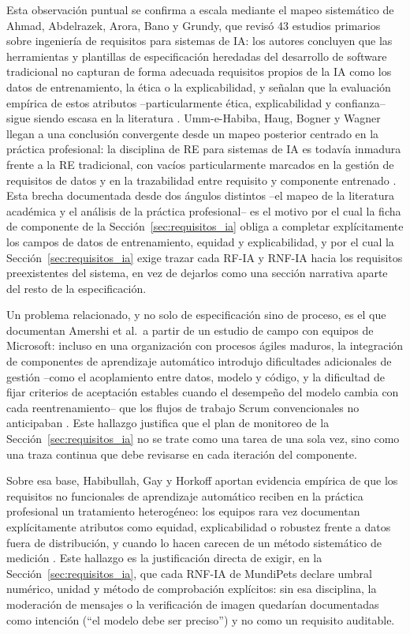 \documentclass[journal,onecolumn]{IEEEtran}
\begin{document}
	Esta observación puntual se confirma a escala mediante el mapeo sistemático de Ahmad, Abdelrazek,
	Arora, Bano y Grundy, que revisó 43 estudios primarios sobre ingeniería de requisitos para
	sistemas de IA: los autores concluyen que las herramientas y plantillas de especificación
	heredadas del desarrollo de software tradicional no capturan de forma adecuada requisitos
	propios de la IA como los datos de entrenamiento, la ética o la explicabilidad, y señalan que
	la evaluación empírica de estos atributos --particularmente ética, explicabilidad y
	confianza-- sigue siendo escasa en la literatura \cite{ahmad2023}. Umm-e-Habiba, Haug, Bogner
	y Wagner llegan a una conclusión convergente desde un mapeo posterior centrado en la práctica
	profesional: la disciplina de RE para sistemas de IA es todavía inmadura frente a la RE
	tradicional, con vacíos particularmente marcados en la gestión de requisitos de datos y en la
	trazabilidad entre requisito y componente entrenado \cite{Habiba2024}. Esta brecha documentada
	desde dos ángulos distintos --el mapeo de la literatura académica y el análisis de la práctica
	profesional-- es el motivo por el cual la ficha de componente de la Sección~\ref{sec:requisitos_ia}
	obliga a completar explícitamente los campos de datos de entrenamiento, equidad y
	explicabilidad, y por el cual la Sección~\ref{sec:requisitos_ia} exige trazar cada RF-IA y
	RNF-IA hacia los requisitos preexistentes del sistema, en vez de dejarlos como una sección
	narrativa aparte del resto de la especificación.

	Un problema relacionado, y no solo de especificación sino de proceso, es el que documentan
	Amershi et al.\ a partir de un estudio de campo con equipos de Microsoft: incluso en una
	organización con procesos ágiles maduros, la integración de componentes de aprendizaje
	automático introdujo dificultades adicionales de gestión --como el acoplamiento entre datos,
	modelo y código, y la dificultad de fijar criterios de aceptación estables cuando el
	desempeño del modelo cambia con cada reentrenamiento-- que los flujos de trabajo Scrum
	convencionales no anticipaban \cite{amershi2019}. Este hallazgo justifica que el plan de
	monitoreo de la Sección~\ref{sec:requisitos_ia} no se trate como una tarea de una sola vez,
	sino como una traza continua que debe revisarse en cada iteración del componente.

	Sobre esa base, Habibullah, Gay y Horkoff aportan evidencia empírica de que los requisitos no
	funcionales de aprendizaje automático reciben en la práctica profesional un tratamiento
	heterogéneo: los equipos rara vez documentan explícitamente atributos como equidad,
	explicabilidad o robustez frente a datos fuera de distribución, y cuando lo hacen carecen de
	un método sistemático de medición \cite{habibullah2023}. Este hallazgo es la justificación
	directa de exigir, en la Sección~\ref{sec:requisitos_ia}, que cada RNF-IA de MundiPets declare
	umbral numérico, unidad y método de comprobación explícitos: sin esa disciplina, la moderación
	de mensajes o la verificación de imagen quedarían documentadas como intención (``el modelo debe
	ser preciso'') y no como un requisito auditable.
\end{document}
